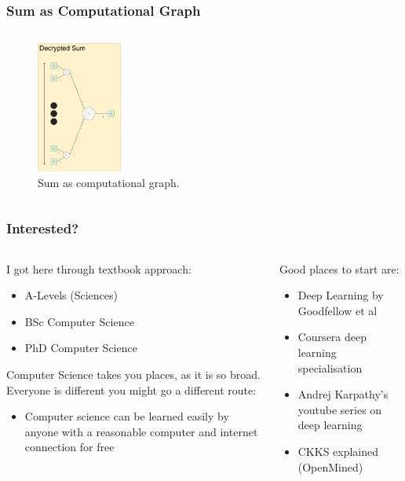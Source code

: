 \documentclass[aspectratio=169]{beamer}
\begin{document}
  \begin{frame}
    \frametitle{Sum as Computational Graph}
    \begin{columns}
      \begin{column}{1\textwidth}
        \begin{figure}[th!]
          \centering
          \includegraphics[width=0.25\textwidth]{sum_computational_graph.pdf}
          \caption{Sum as computational graph. \autocite{repository}}
          \label{fig:sum_computational_graph}
        \end{figure}
      \end{column}
    \end{columns}
  \end{frame}

  \begin{frame}
    \frametitle{Interested?}
    \begin{columns}
      \begin{column}{0.5\textwidth}
        I got here through textbook approach:
        \begin{itemize}
          \item A-Levels (Sciences)
          \item BSc Computer Science
          \item PhD Computer Science
        \end{itemize}
        Computer Science takes you places, as it is so broad.\\
        Everyone is different you might go a different route:
        \begin{itemize}
          \item Computer science can be learned easily by anyone with a reasonable computer and internet connection for free
        \end{itemize}
      \end{column}
      \begin{column}{0.5\textwidth}
        Good places to start are:
        \begin{itemize}
            \item Deep Learning by Goodfellow et al \autocite{Goodfellow-et-al-2016}
            \item Coursera deep learning specialisation
            \item Andrej Karpathy's youtube series on deep learning \autocite{andrejkarpathy}
            \item CKKS explained (OpenMined) \autocite{openmined}
        \end{itemize}
      \end{column}
    \end{columns}
  \end{frame}
\end{document}
